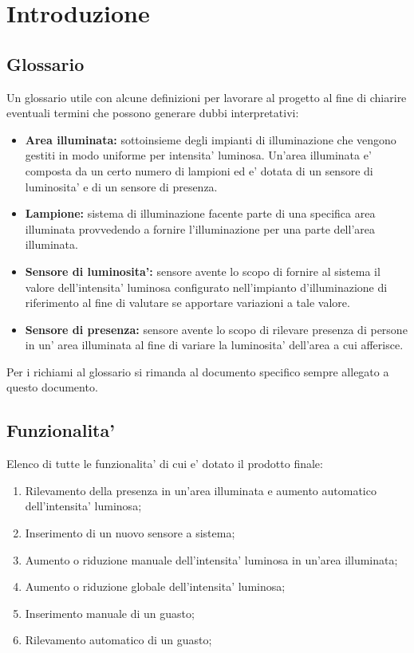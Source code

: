 \chapter{Introduzione}

\section{Glossario}

Un glossario utile con alcune definizioni per lavorare al progetto al fine di chiarire eventuali termini che possono generare
dubbi interpretativi:
\begin{itemize}
    \item \textbf{Area illuminata:} sottoinsieme degli impianti di illuminazione che vengono gestiti in
modo uniforme per intensita' luminosa. Un'area illuminata e' composta da un certo numero di lampioni ed e' dotata di un sensore 
di luminosita' e di un sensore di presenza.
    \item \textbf{Lampione:} sistema di illuminazione facente parte di una specifica area illuminata provvedendo a fornire 
    l'illuminazione per una parte dell'area illuminata.
    \item \textbf{Sensore di luminosita':} sensore avente lo scopo di fornire al sistema il valore dell'intensita' luminosa 
    configurato nell'impianto d'illuminazione di riferimento al fine di valutare se apportare variazioni a tale valore.
    \item \textbf{Sensore di presenza:} sensore avente lo scopo di rilevare presenza di persone in un' area illuminata al fine 
    di variare la luminosita' dell'area a cui afferisce.
\end{itemize}

Per i richiami al glossario si rimanda al documento specifico sempre allegato a questo documento.

\section{Funzionalita'}
Elenco di tutte le funzionalita' di cui e' dotato il prodotto finale:
\begin{enumerate}
    \item Rilevamento della presenza in un’area illuminata e aumento automatico dell’intensita' luminosa;
    \item Inserimento di un nuovo sensore a sistema;
    \item Aumento o riduzione manuale dell’intensita' luminosa in un’area illuminata;
    \item Aumento o riduzione globale dell’intensita' luminosa;
    \item Inserimento manuale di un guasto;
    \item Rilevamento automatico di un guasto;
\end{enumerate}